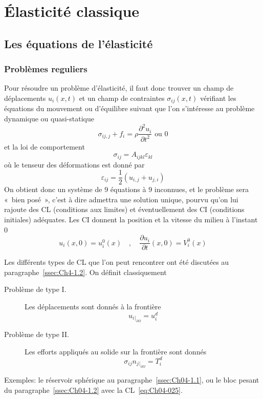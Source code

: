 \chapter{Élasticité classique}
\section{Les équations de l'élasticité}
\subsection{Problèmes reguliers}
Pour résoudre un problème d'élasticité, il faut donc trouver un champ de déplacements $u_i\left( x,t \right)$ et un champ de contraintes $\sigma_{ij}\left( x,t \right)$ vérifiant les équations du mouvement ou d'équilibre suivant que l'on s'intéresse au problème dynamique ou quasi-statique
\begin{equation}
    \sigma_{ij,j} + f_i = \rho \frac{\partial^2 u_i}{\partial t^2} \text{ ou } 0
    \label{eq:Ch06-001}
\end{equation}
et la loi de comportement
\begin{equation}
    \sigma_{ij} = A_{ijkl} \varepsilon_{kl}
    \label{eq:Ch06-002}
\end{equation}
où le tenseur des déformations est donné par
\begin{equation}
    \varepsilon_{ij} = \frac{1}{2} \left( u_{i,j} + u_{j,i} \right)
    \label{eq:Ch06-003}
\end{equation}
On obtient donc un système de 9 équations à 9 inconnues, et le problème sera «~bien posé~», c'est à dire admettra une solution unique, pourvu qu'on lui rajoute des CL (conditions aux limites) et éventuellement des CI (conditions initiales) adéquates.
Les CI donnent la position et la vitesse du milieu à l'instant 0
\begin{equation}
    u_i \left( x,0 \right) = u_{i}^0 (x) \quad, \quad \frac{\partial u_i}{\partial t} \left( x,0 \right) = V_i^0 \left( x \right)
    \label{eq:Ch06-004}
\end{equation}

Les différents types de CL que l'on peut rencontrer ont été discutées au paragraphe~\ref{ssec:Ch4-1.2}.
On définit classiquement
\begin{description}
    \item[Problème de type I.] Les déplacements sont donnés à la frontière
        \begin{equation}
            u_i{}_{|_{\partial \Omega}} = u_i^d
            \label{eq:Ch06-005}
        \end{equation}
    \item[Problème de type II.] Les efforts appliqués au solide sur la frontière sont donnés
        \begin{equation}
            \sigma_{ij} n_j{}_{|_{\partial \Omega}} = T_i^d
            \label{eq:Ch06-006}
        \end{equation}
\end{description}
Exemples: le réservoir sphérique au paragraphe~\ref{ssec:Ch04-1.1}, ou le bloc pesant du paragraphe~\ref{ssec:Ch04-1.2} avec la CL~\eqref{eq:Ch04-025}.

